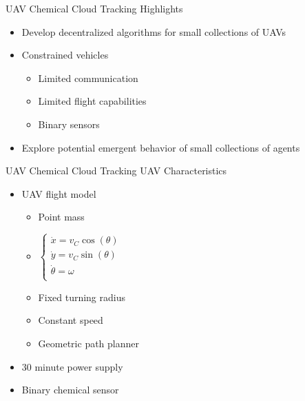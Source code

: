 \begin{slide}{UAV Chemical Cloud Tracking}
  Highlights
  \begin{itemize}
  \item Develop decentralized algorithms for small collections of UAVs
  \item Constrained vehicles
    \begin{itemize}
    \item Limited communication
    \item Limited flight capabilities
    \item Binary sensors
    \end{itemize}
  \item Explore potential emergent behavior of small collections of agents
  \end{itemize}
\end{slide}


%


\begin{slide}{UAV Chemical Cloud Tracking}
  UAV Characteristics
  \begin{itemize}
  \item UAV flight model
    \begin{itemize}
    \item Point mass
    \item
      $\left\{ 
      \begin{array}{l}
        \dot {x}=v_C \cos (\theta ) \\ 
        \dot {y}=v_C \sin (\theta ) \\ 
        \dot {\theta}=\omega \\
      \end{array}
      \right.$
    \item Fixed turning radius
    \item Constant speed
    \item Geometric path planner
    \end{itemize}
  \item 30 minute power supply
  \item Binary chemical sensor
  \end{itemize}
\end{slide}


